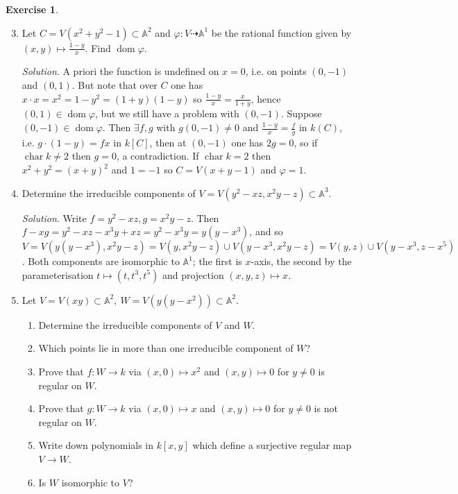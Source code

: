\documentclass{article}
\newcommand{\A}{\mathbb{A}}
\newcommand{\Char}{\operatorname{char}}
\newcommand{\dom}{\operatorname{dom}}
\theoremstyle{definition}
\newtheorem{exe}[defn]{Exercise}
\begin{document}
\begin{exe}
\begin{enumerate}
\setcounter{enumi}{2}
\item Let $C=V(x^2+y^2-1)\subset\A^2$ and $\varphi: V\dashrightarrow\A^1$ be the rational function given by $(x,y)\mapsto\frac{1-y}{x}$. Find $\dom\varphi$.

\textit{Solution}. A priori the function is undefined on $x=0$, i.e. on points $(0,-1)$ and $(0,1)$. But note that over $C$ one has $x\cdot x=x^2=1-y^2=(1+y)(1-y)$ so $\frac{1-y}{x}=\frac{x}{1+y}$, hence $(0,1)\in\dom\varphi$, but we still have a problem with $(0,-1)$. Suppose $(0,-1)\in\dom\varphi$. Then $\exists f,g$ with $g(0,-1)\neq 0$ and $\frac{1-y}{x}=\frac{f}{g}$ in $k(C)$, i.e. $g\cdot (1-y)=fx$ in $k[C]$, then at $(0,-1)$ one has $2g=0$, so if $\Char k\neq 2$ then $g=0$, a contradiction. If $\Char k=2$ then $x^2+y^2=(x+y)^2$ and $1=-1$ so $C=V(x+y-1)$ and $\varphi=1$.

\item Determine the irreducible components of $V=V(y^2-xz,x^2y-z)\subset\A^3$.

\textit{Solution}. Write $f=y^2-xz,g=x^2y-z$. Then $f-xg=y^2-xz-x^3y+xz=y^2-x^3y=y(y-x^3)$, and so $V=V(y(y-x^3),x^2y-z)=V(y,x^2y-z)\cup V(y-x^3,x^2y-z)=V(y,z)\cup V(y-x^3,z-x^5)$. Both components are isomorphic to $\A^1$; the first is $x$-axis, the second by the parameterisation $t\mapsto (t,t^3,t^5)$ and projection $(x,y,z)\mapsto x$.

\item Let $V=V(xy)\subset\A^2,\ W=V(y(y-x^2))\subset\A^2$.
\begin{enumerate}
\item Determine the irreducible components of $V$ and $W$.
\item Which points lie in more than one irreducible component of $W$?
\item Prove that $f:W\rightarrow k$ via $(x,0)\mapsto x^2$ and $(x,y)\mapsto 0$ for $y\neq 0$ is regular on $W$.
\item Prove that $g:W\rightarrow k$ via $(x,0)\mapsto x$ and $(x,y)\mapsto 0$ for $y\neq 0$ is not regular on $W$.
\item Write down polynomials in $k[x,y]$ which define a surjective regular map $V\rightarrow W$.
\item Is $W$ isomorphic to $V$?
\end{enumerate}


\end{enumerate}
\end{exe}
\end{document}
